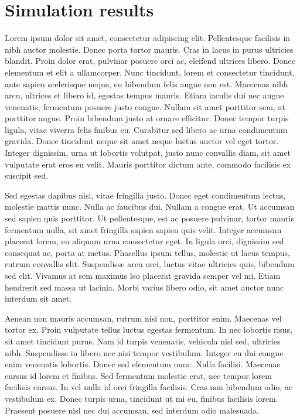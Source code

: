 \chapter{Simulation results}
\label{appx:simulation}

Lorem ipsum dolor sit amet, consectetur adipiscing elit. Pellentesque facilisis in nibh auctor molestie. Donec porta tortor mauris. Cras in lacus in purus ultricies blandit. Proin dolor erat, pulvinar posuere orci ac, eleifend ultrices libero. Donec elementum et elit a ullamcorper. Nunc tincidunt, lorem et consectetur tincidunt, ante sapien scelerisque neque, eu bibendum felis augue non est. Maecenas nibh arcu, ultrices et libero id, egestas tempus mauris. Etiam iaculis dui nec augue venenatis, fermentum posuere justo congue. Nullam sit amet porttitor sem, at porttitor augue. Proin bibendum justo at ornare efficitur. Donec tempor turpis ligula, vitae viverra felis finibus eu. Curabitur sed libero ac urna condimentum gravida. Donec tincidunt neque sit amet neque luctus auctor vel eget tortor. Integer dignissim, urna ut lobortis volutpat, justo nunc convallis diam, sit amet vulputate erat eros eu velit. Mauris porttitor dictum ante, commodo facilisis ex suscipit sed.

Sed egestas dapibus nisl, vitae fringilla justo. Donec eget condimentum lectus, molestie mattis nunc. Nulla ac faucibus dui. Nullam a congue erat. Ut accumsan sed sapien quis porttitor. Ut pellentesque, est ac posuere pulvinar, tortor mauris fermentum nulla, sit amet fringilla sapien sapien quis velit. Integer accumsan placerat lorem, eu aliquam urna consectetur eget. In ligula orci, dignissim sed consequat ac, porta at metus. Phasellus ipsum tellus, molestie ut lacus tempus, rutrum convallis elit. Suspendisse arcu orci, luctus vitae ultricies quis, bibendum sed elit. Vivamus at sem maximus leo placerat gravida semper vel mi. Etiam hendrerit sed massa ut lacinia. Morbi varius libero odio, sit amet auctor nunc interdum sit amet.

Aenean non mauris accumsan, rutrum nisi non, porttitor enim. Maecenas vel tortor ex. Proin vulputate tellus luctus egestas fermentum. In nec lobortis risus, sit amet tincidunt purus. Nam id turpis venenatis, vehicula nisl sed, ultricies nibh. Suspendisse in libero nec nisi tempor vestibulum. Integer eu dui congue enim venenatis lobortis. Donec sed elementum nunc. Nulla facilisi. Maecenas cursus id lorem et finibus. Sed fermentum molestie erat, nec tempor lorem facilisis cursus. In vel nulla id orci fringilla facilisis. Cras non bibendum odio, ac vestibulum ex. Donec turpis urna, tincidunt ut mi eu, finibus facilisis lorem. Praesent posuere nisl nec dui accumsan, sed interdum odio malesuada.
